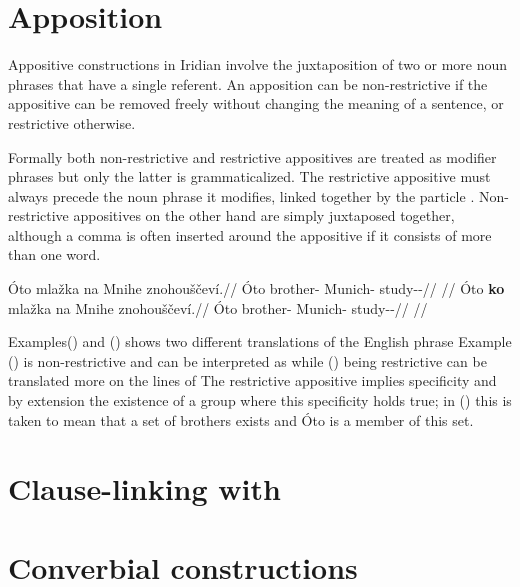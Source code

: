 \section{Apposition}\label{sec:apposition}

Appositive constructions in Iridian involve the juxtaposition of two or more noun phrases that have a single referent. An apposition can be non-restrictive if the appositive can be removed freely without changing the meaning of a sentence, or restrictive otherwise.

Formally both non-restrictive and restrictive appositives are treated as modifier phrases but only the latter is grammaticalized. The restrictive appositive must always precede the noun phrase it modifies, linked together by the particle . Non-restrictive appositives on the other hand are simply juxtaposed together, although a comma is often inserted around the appositive if it consists of more than one word.

\pex\a
\begingl{}
    \gla \'Oto mlažka na Mnihe znohouščeví.//
    \glb  \'Oto brother-\Dim{} \Loc{} Munich-\Pat{} study-\Av{}-\Cont{}//
    \glft {}//
\endgl
\a\begingl{}
    \gla \'Oto \textbf{ko} mlažka na Mnihe znohouščeví.//
    \glb  \'Oto \Lnk{} brother-\Dim{} \Loc{} Munich-\Pat{} study-\Av{}-\Cont{}//
    \glft {}//
\endgl
\xe

Examples() and () shows two different translations of the English phrase  Example () is non-restrictive and can be interpreted as  while () being restrictive can be translated more on the lines of  The restrictive appositive implies specificity and by extension the existence of a group where this specificity holds true; in () this is taken to mean that a set of brothers exists and \'Oto is a member of this set.

\section{Clause-linking with }

\section{Converbial constructions}\label{converbs-syntax}

